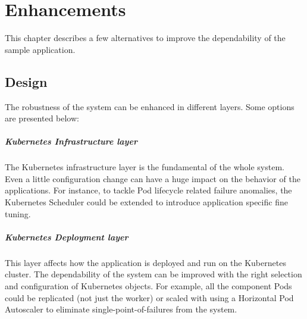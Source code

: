 \chapter{Enhancements} \label{enhancements}

This chapter describes a few alternatives to improve the dependability of the sample application.

\section{Design}


The robustness of the system can be enhanced in different layers. Some options are presented below:

\paragraph{Kubernetes Infrastructure layer} The Kubernetes infrastructure layer is the fundamental of the whole system. Even a little configuration change can have a huge impact on the behavior of the applications. For instance, to tackle Pod lifecycle related failure anomalies, the Kubernetes Scheduler could be extended to introduce application specific fine tuning.

\paragraph{Kubernetes Deployment layer} This layer affects how the application is deployed and run on the Kubernetes cluster. The dependability of the system can be improved with the right selection and configuration of Kubernetes objects. For example, all the component Pods could be replicated (not just the worker) or scaled with using a Horizontal Pod Autoscaler to eliminate single-point-of-failures from the system.


